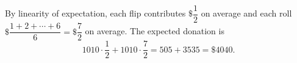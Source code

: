 By linearity of expectation, each flip contributes $\$\dfrac12$ on average and each roll $\$\dfrac{1+2+\cdots+6}{6}=\$\dfrac72$ on average. The expected donation is
\[1010\cdot\dfrac12+1010\cdot\dfrac72=505+3535=\boxed{\$4040}.\]

